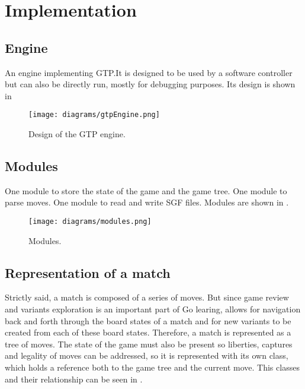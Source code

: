 \section{Implementation}

\subsection{Engine}

An engine implementing GTP.\@ It is designed to be used by a software controller
but can also be directly run, mostly for debugging purposes. Its design is shown
in 

\begin{figure}[h]
	\begin{center}
		\texttt{[image: diagrams/gtpEngine.png]}
		\caption{Design of the GTP engine.}\label{fig:engine}
	\end{center}
\end{figure}

\subsection{Modules}

One module to store the state of the game and the game tree. One module to parse
moves. One module to read and write SGF files. Modules are shown in
.

\begin{figure}[h]
	\begin{center}
		\texttt{[image: diagrams/modules.png]}
		\caption{Modules.}\label{fig:modules}
	\end{center}
\end{figure}

\subsection{Representation of a match}

Strictly said, a match is composed of a series of moves. But since game review
and variants exploration is an important part of Go learing, \program{} allows
for navigation back and forth through the board states of a match and for new
variants to be created from each of these board states. Therefore, a match is
represented as a tree of moves. The state of the game must also be present so
liberties, captures and legality of moves can be addressed, so it is represented
with its own class, which holds a reference both to the game tree and the
current move. This classes and their relationship can be seen in
.

